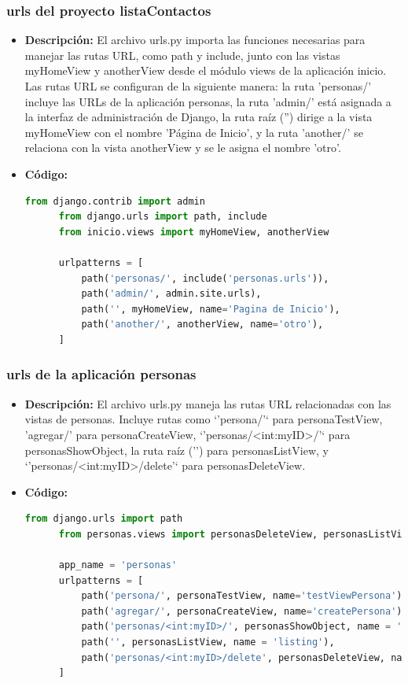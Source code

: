 \documentclass{article}
\begin{document}
  \subsubsection{urls del proyecto listaContactos}
  \begin{itemize}
    \item \textbf{Descripción: }El archivo urls.py importa las funciones necesarias para manejar las rutas URL, como path y include, 
    junto con las vistas myHomeView y anotherView desde el módulo views de la aplicación inicio. Las rutas URL se configuran de la 
    siguiente manera: la ruta 'personas/' incluye las URLs de la aplicación personas, la ruta 'admin/' está asignada a la interfaz 
    de administración de Django, la ruta raíz ('') dirige a la vista myHomeView con el nombre 'Página de Inicio', y la ruta 'another/' 
    se relaciona con la vista anotherView y se le asigna el nombre 'otro'.
    \item \textbf{Código: }
    \begin{lstlisting}[language=Python]
      from django.contrib import admin
      from django.urls import path, include
      from inicio.views import myHomeView, anotherView

      urlpatterns = [
          path('personas/', include('personas.urls')),
          path('admin/', admin.site.urls),
          path('', myHomeView, name='Pagina de Inicio'),
          path('another/', anotherView, name='otro'),
      ]
    \end{lstlisting}   
  \end{itemize}
  
  
  \subsubsection{urls de la aplicación personas}
  \begin{itemize}
    \item \textbf{Descripción: }El archivo urls.py maneja las rutas URL relacionadas con las vistas de personas. 
    Incluye rutas como `'persona/'` para personaTestView, 'agregar/' para personaCreateView, `'personas/<int:myID>/'` 
    para personasShowObject, la ruta raíz ('') para personasListView, y `'personas/<int:myID>/delete'` para personasDeleteView.
    \item \textbf{Código: }
    \begin{lstlisting}[language=Python]
      from django.urls import path
      from personas.views import personasDeleteView, personasListView, personaTestView, personaCreateView, searchForHelp,  personasAnotherCreateView, personasShowObject

      app_name = 'personas'
      urlpatterns = [
          path('persona/', personaTestView, name='testViewPersona'),
          path('agregar/', personaCreateView, name='createPersona'),
          path('personas/<int:myID>/', personasShowObject, name = 'browsing'),
          path('', personasListView, name = 'listing'),
          path('personas/<int:myID>/delete', personasDeleteView, name = 'deleting'),
      ]
    \end{lstlisting}   
  \end{itemize}
\end{document}
